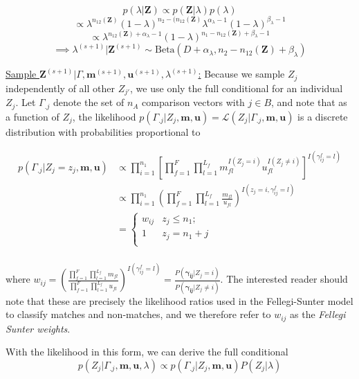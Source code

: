 \documentclass[12pt,letterpaper]{article}
\newcommand{\1}[1]{\mathbb{I}\!\left[#1\right]} %
\begin{document}
\[p(\lambda | \mathbf{Z}) \propto p(\mathbf{Z}|\lambda)p(\lambda)\]
\[\propto \lambda^{n_{12}(\mathbf{Z})} (1-\lambda)^{n_2 - (n_{12}(\mathbf{Z})} \lambda^{\alpha_{\lambda} -1} (1-\lambda)^{\beta_{\lambda} -1}\]
\[ \propto \lambda^{n_{12}(\mathbf{Z}) + \alpha_{\lambda} - 1} (1-\lambda)^{n_1 - n_{12}(\mathbf{Z}) + \beta_{\lambda} -1}\]
\[\implies \lambda^{(s+1)}|\mathbf{Z}^{(s+1)} \sim \text{Beta}(D + \alpha_{\lambda}, n_2 - n_{12}(\mathbf{Z}) + \beta_{\lambda})\]

\underline{Sample $\mathbf{Z}^{(s+1)}|\Gamma, \mathbf{m}^{(s+1)}, \mathbf{u}^{(s+1)}, \lambda^{(s+1)}$:}
Because we sample \(Z_j\) independently of all other \(Z_{j'}\), we use
only the full conditional for an individual \(Z_j\). Let \(\Gamma_{.j}\)
denote the set of \(n_A\) comparison vectors with \(j \in B\), and note
that as a function of \(Z_j\), the likelihood
\(p(\Gamma_{.j}|Z_j, \mathbf{m}, \mathbf{u}) = \mathcal{L}(Z_j|\Gamma_{.j}, \mathbf{m}, \mathbf{u})\)
is a discrete distribution with probabilities proportional to

\begin{align*}
	p(\Gamma_{.j}|Z_j = z_j, \mathbf{m}, \mathbf{u}) &\propto \prod_{i=1}^{n_1}\left[\prod_{f=1}^{F}\prod_{l=1}^{L_f} m_{fl}^{I(Z_j = i)}u_{fl}^{I(Z_j \neq i)}\right]^{I(\gamma_{ij}^f = l)}\\
	&\propto \prod_{i=1}^{n_1}\left(\prod_{f=1}^{F}\prod_{l=1}^{L_f} \frac{m_{fl}}{u_{fl}}\right)^{I(z_j = i, \gamma_{ij}^f = l)} \\
	&=
	\begin{cases} 
		w_{ij}  & z_j \leq n_1; \\
		1 &  z_j  = n_1 + j \\
	\end{cases}\\
\end{align*}

where
\(w_{ij} = \left(\frac{\prod_{f=1}^{F}\prod_{l=1}^{L_f} m_{fl}}{\prod_{f=1}^{F}\prod_{l=1}^{L_f} u_{fl}}\right)^{I(\gamma_{ij}^f = l)} = \frac{P(\boldsymbol{\gamma_{ij}}|Z_j = i)}{P(\boldsymbol{\gamma_{ij}} |Z_j \neq i)}\).
The interested reader should note that these are precisely the
likelihood ratios used in the Fellegi-Sunter model to classify matches
and non-matches, and we therefore refer to \(w_{ij}\) as the
\emph{Fellegi Sunter weights}.

With the likelihood in this form, we can derive the full conditional
\[p(Z_j|\Gamma_{.j}, \mathbf{m} ,\mathbf{u}, \lambda) \propto p(\Gamma_{.j}| Z_j, \mathbf{m} ,\mathbf{u}) P(Z_j|\lambda)\]
\end{document}
